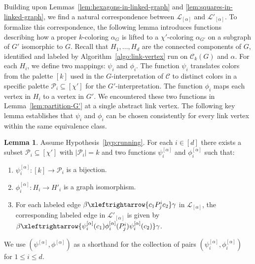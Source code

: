 \documentclass{amsart}
\theoremstyle{hypothesisstyle}
\theoremstyle{definition}
\newtheorem{lemma}[theorem]{Lemma}
\theoremstyle{remark}
\numberwithin{equation}{section}
\newcommand{\abs}[1]{\lvert#1\rvert}
\newcommand{\C}{\mathcal C}
\begin{document}
Building upon Lemmas~\ref{lem:hexagons-in-linked-graph} and \ref{lem:squares-in-linked-graph}, we find a natural correspondence between $\mathcal{L}_{[\alpha]}$ and $\mathcal{L}'_{[\alpha]}$. To formalize this correspondence, the following lemma introduces functions describing how a proper $k$-coloring $\alpha_{G}$ is lifted to a $\chi'$-coloring $\alpha_{G'}$ on a subgraph of $G'$ isomorphic to $G$. Recall that $H_1,\dots, H_d$ are the connected components of $G$, identified and labeled by Algorithm~\ref{algo:link-vertex} run on $\mathcal{C}_k(G)$ and $\alpha$. For each $H_i$, we define two mappings: $\psi_i$ and $\phi_i$. The function $\psi_i$ translates colors from the palette $[k]$ used in the $G$-interpretation of $\C$ to distinct colors in a specific palette $\mathcal{P}_i\subseteq [\chi']$ for the $G'$-interpretation. The function $\phi_i$ maps each vertex in $H_i$ to a vertex in $G'$. We encountered these two functions in Lemma~\ref{lem:partition-G'} at a single abstract link vertex. The following key lemma establishes that $\psi_i$ and $\phi_i$ can be chosen consistently for every link vertex within the same equivalence class. 

\begin{lemma}\label{lem:gluing-lifting-data}
Assume Hypothesis~\ref{hyp:running}.  For each $i\in[d]$ there exists a subset $\mathcal P_i\subseteq [\chi']$ with $\abs{\mathcal P_i}=k$ and two functions $\psi^{[\alpha]}_{i}$  and $\phi^{[\alpha]}_{i}$ such that:
\begin{enumerate}
    \item $\psi^{[\alpha]}_{i}\colon [k]\to \mathcal{P}_i$ is a bijection.
    \item $\phi^{[\alpha]}_{i}\colon H_i\to H'_i$ is a graph isomorphism. 
    \item\label{item:LLG:comp} For each labeled edge $\beta\xleftrightarrow{c_1 P^i_{j}c_2} \gamma$ in $\mathcal{L}_{[\alpha]}$, the corresponding labeled edge in $\mathcal{L}'_{[\alpha]}$ is given by $\beta\xleftrightarrow{\psi_i^{[\alpha]}(c_1) \phi_i^{[\alpha]}(P^i_{j})\psi_i^{[\alpha]}(c_2)} \gamma$.
\end{enumerate}
We use $(\psi^{[\alpha]}, \phi^{[\alpha]})$ as a shorthand for the collection of pairs $(\psi_i^{[\alpha]}, \phi_i^{[\alpha]})$ for $1\leq i\leq d$.
\end{lemma}
\end{document}
